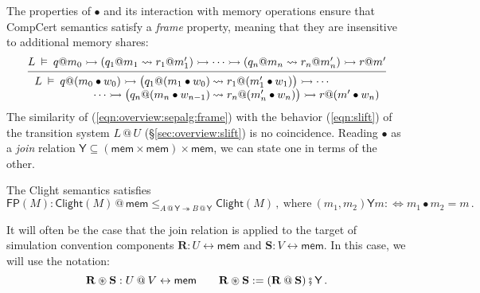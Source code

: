 \documentclass[acmsmall,nonacm]{acmart}
\newcommand{\kw}[1]{\ensuremath{ \mathsf{#1} }}
\newcommand{\jr}{\mathsf{Y}}
\newcommand{\vcomp}{\fatsemi}
\newcommand{\sepconj}{\oast}
\begin{document}
The properties of $\bullet$
and its interaction with memory operations
ensure that CompCert semantics satisfy
a \emph{frame} property,
meaning that they are insensitive to
additional memory shares:
\begin{equation} \label{eqn:overview:sepalg:frame}
  \begin{prooftree}
  \hypo{
  L \:\vDash\: q@m_0 \rightarrowtail
    (q_1@m_1 \leadsto r_1@m_1') \rightarrowtail
    \cdots \rightarrowtail
    (q_n@m_n \leadsto r_n@m_n') \rightarrowtail
    r@m'}
  \infer1{
   {\begin{array}{r@{\:}l}
    L \:\vDash\: q@(m_0 \bullet w_0) \rightarrowtail
      \big( q_1@(m_1 \bullet w_0) &\leadsto r_1@(m_1' \bullet w_1) \big) \rightarrowtail
      \cdots \\ \cdots \rightarrowtail
      \big( q_n@(m_n \bullet w_{n-1}) &\leadsto r_n@(m_n' \bullet w_n) \big) \rightarrowtail
      r@(m' \bullet w_n)
   \end{array}} }
  \end{prooftree}
\end{equation}
The similarity of (\ref{eqn:overview:sepalg:frame})
with the behavior (\ref{eqn:slift})
of the transition system $L \mathbin@ U$ (\S\ref{sec:overview:slift})
is no coincidence.
Reading $\bullet$ as a \emph{join} relation
$\jr \subseteq (\kw{mem} \times \kw{mem}) \times \kw{mem}$,
we can state one in terms of the other.

\begin{theorem} \label{thm:clightframe}
The Clight semantics satisfies
\[
  \kw{FP}(M) :
  \kw{Clight}(M) \mathbin@ \kw{mem}
  \le_{A \mathbin@ \jr \twoheadrightarrow B \mathbin@ \jr}
  \kw{Clight}(M)
  \,,
  \: \text{where} \:
  (m_1, m_2) \mathrel{\jr} m  :\Leftrightarrow
  m_1 \bullet m_2 = m
  \,.
\]
\end{theorem}

It will often be the case that the join relation
is applied to the target of
simulation convention components
$\mathbf{R} : U \leftrightarrow \kw{mem}$ and
$\mathbf{S} : V \leftrightarrow \kw{mem}$.
In this case,
we will use the notation:
\[
  \mathbf{R} \sepconj \mathbf{S} : U \mathbin@ V \leftrightarrow \kw{mem}
  \qquad
  \mathbf{R} \sepconj \mathbf{S} :=
  (\mathbf{R} \mathbin@ \mathbf{S}) \vcomp \jr
  \,.
\]
\end{document}
